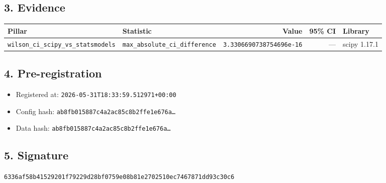 \documentclass{article}
\begin{document}
\subsection*{3. Evidence}
\begin{tabular}{llrrl}\toprule
\textbf{Pillar} & \textbf{Statistic} & \textbf{Value} & \textbf{95\% CI} & \textbf{Library} \\\midrule
\texttt{wilson\_ci\_scipy\_vs\_statsmodels} & \texttt{max\_absolute\_ci\_difference} & \texttt{3.3306690738754696e-16} & --- & scipy 1.17.1 \\
\bottomrule\end{tabular}
\subsection*{4. Pre-registration}
\begin{itemize}
\item Registered at: \texttt{2026-05-31T18:33:59.512971+00:00}
\item Config hash: \texttt{ab8fb015887c4a2ac85c8b2ffe1e676a\dots}
\item Data hash: \texttt{ab8fb015887c4a2ac85c8b2ffe1e676a\dots}
\end{itemize}
\subsection*{5. Signature}
\texttt{6336af58b41529201f79229d28bf0759e08b81e2702510ec7467871dd93c30c6}\\
\end{document}
